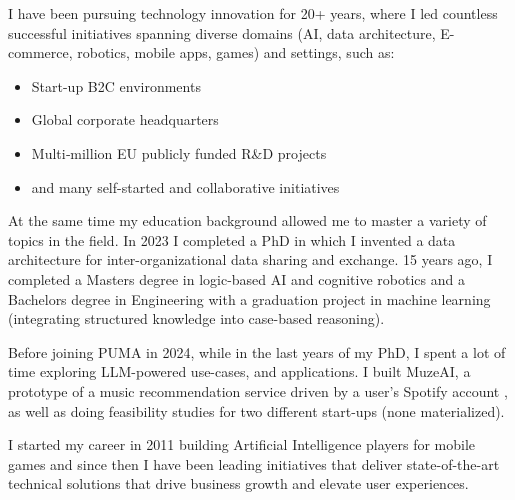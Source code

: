 \clearpage
{}




\vspace{4ex}


\vspace{2ex}

I have been pursuing technology innovation for 20+ years, where I led countless successful initiatives spanning diverse domains (AI, data architecture, E-commerce, robotics, mobile apps, games) and settings, such as:

\begin{itemize}

\item Start-up B2C environments 
\item Global corporate headquarters
\item Multi‑million EU publicly funded R\&D projects
\item and many self-started and collaborative initiatives

\end{itemize}

At the same time my education background allowed me to master a variety of topics in the field. In 2023 I completed a PhD in which I invented a data architecture for inter-organizational data sharing and exchange. 15 years ago, I completed a Masters degree in logic-based AI and cognitive robotics and a Bachelors degree in Engineering with a graduation project in machine learning (integrating structured knowledge into case-based reasoning).

Before joining PUMA in 2024, while in the last years of my PhD, I spent a lot of time exploring LLM-powered use-cases, and applications. I built MuzeAI, a prototype of a music recommendation service driven by a user’s Spotify account , as well as doing feasibility studies for two different start-ups (none materialized). 

I started my career in 2011 building Artificial Intelligence players for mobile games and since then I have been leading initiatives that deliver state-of-the-art technical solutions that drive business growth and elevate user experiences.


